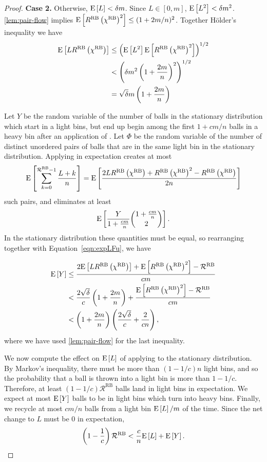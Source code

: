 \begin{proof}
\medskip 

{\bf Case 2.} Otherwise, $\mathrm{E}\left[L\right] < \delta m$. Since $L \in [0, m]$, $\mathrm{E}\left[L^2\right] <
	\delta m^2$. \cref{lem:pair-flow} implies $\mathrm{E}\left[R^\textrm{RB}\left(\chi^\textrm{RB}\right)^2\right] \le (1+2m/n)^2$. Together H\"{o}lder's inequality we have
\begin{align}
	\mathrm{E}\left[LR^\textrm{RB}\left(\chi^\textrm{RB}\right)\right]
	&\le \left(\mathrm{E}\left[L^2\right]\mathrm{E}\left[R^\textrm{RB}\left(\chi^\textrm{RB}\right)^2\right]\right)^{1/2} \nonumber \\
	&< \left(\delta m^2 \left(1+\frac{2m}{n}\right)^2\right)^{1/2} \nonumber\\
	&= \sqrt{\delta} m\left(1 + \frac{2m}{n}\right) \label{eqn:expLFu}
\end{align}

	Let $Y$ be the random variable of the number of balls in the stationary
	distribution which start in a light bins, but end up begin among the first
	$1 + cm/n$ balls in a heavy bin after an application of \RB.  Let $\Phi$
	be the random variable of the number of distinct unordered pairs of balls
	that are in the same light bin in the stationary distribution. Applying \RB
	in expectation creates at most
        \[ \mathrm{E}\left[\sum_{k=0}^{\mathcal{R}^\textrm{RB}-1}\frac{L + k}{n}\right] = \mathrm{E}\left[\frac{2LR^\textrm{RB}\left(\chi^\textrm{RB}\right) + R^\textrm{RB}\left(\chi^\textrm{RB}\right)^2 - R^\textrm{RB}\left(\chi^\textrm{RB}\right)}{2n}\right] \]
	such pairs, and eliminates at least
	\[ \mathrm{E}\left[\frac{Y}{1+\frac{cm}{n}}\binom{1+\frac{cm}{n}}{2}\right].\]
	In the stationary distribution these quantities must be equal, so
	rearranging together with Equation~\eqref{eqn:expLFu}, we have
	
\begin{align*}
	\mathrm{E}\left[Y\right] 
	&\le \frac{2\mathrm{E}\left[LR^\textrm{RB}\left(\chi^\textrm{RB}\right)\right] + \mathrm{E}\left[R^\textrm{RB}\left(\chi^\textrm{RB}\right)^2\right] - \mathcal{R}^\textrm{RB}}{cm} \nonumber \\
	&< \frac{2\sqrt{\delta}}{c}\left(1+\frac{2m}{n}\right) + \frac{\mathrm{E}\left[R^\textrm{RB}\left(\chi^\textrm{RB}\right)^2\right] - \mathcal{R}^\textrm{RB}}{cm} \\
	&<\left(1+\frac{2m}{n}\right)\left(\frac{2\sqrt{\delta}}{c}+\frac{2}{cn}\right),  
\end{align*}
where we have used \cref{lem:pair-flow} for the last inequality.

We now compute the effect on $\mathrm{E}\left[L\right]$ of applying \RB to the stationary
distribution.  By Markov's inequality, there must be more than $(1-1/c)n$ light
bins, and so the probability that a ball is thrown into a light bin is more
than $1-1/c$. Therefore, at least $(1-1/c)\mathcal{R}^\textrm{RB}$ balls land
in light bins in expectation. We expect at most $\mathrm{E}\left[Y\right]$ balls to be in light
bins which turn into heavy bins. Finally, we recycle at most $cm/n$ balls from
a light bin $\mathrm{E}\left[L\right]/m$ of the time. Since the net change to $L$ must be $0$ in
expectation,
\[\left(1-\frac{1}{c}\right)\mathcal{R}^\textrm{RB} < \frac{c}{n}\mathrm{E}\left[L\right] + \mathrm{E}\left[Y\right].\]


\end{proof}

